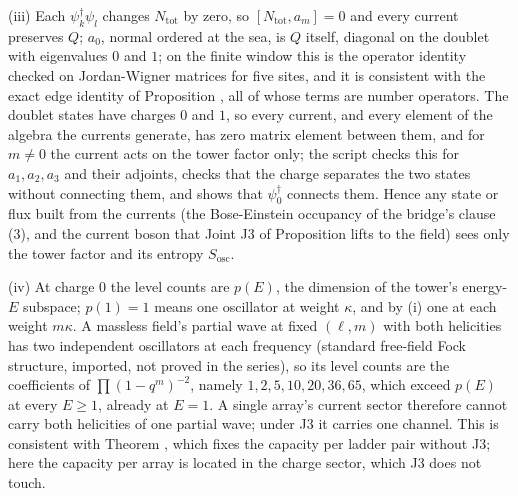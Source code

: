 (iii) Each $\psi_{k}^{\dagger}\psi_{l}$ changes $N_{\mathrm{tot}}$ by zero, so $[N_{\mathrm{tot}}, a_{m}] = 0$ and every current preserves $Q$; $a_{0}$, normal ordered at the sea, is $Q$ itself, diagonal on the doublet with eigenvalues $0$ and $1$; on the finite window this is the operator identity checked on Jordan-Wigner matrices for five sites, and it is consistent with the exact edge identity of Proposition , all of whose terms are number operators. The doublet states have charges $0$ and $1$, so every current, and every element of the algebra the currents generate, has zero matrix element between them, and for $m \neq 0$ the current acts on the tower factor only; the script checks this for $a_{1}, a_{2}, a_{3}$ and their adjoints, checks that the charge separates the two states without connecting them, and shows that $\psi_{0}^{\dagger}$ connects them. Hence any state or flux built from the currents (the Bose-Einstein occupancy of the bridge's clause (3), and the current boson that Joint J3 of Proposition  lifts to the field) sees only the tower factor and its entropy $S_{\mathrm{osc}}$.

(iv) At charge $0$ the level counts are $p(E)$, the dimension of the tower's energy-$E$ subspace; $p(1) = 1$ means one oscillator at weight $\kappa$, and by (i) one at each weight $m\kappa$. A massless field's partial wave at fixed $(\ell, m)$ with both helicities has two independent oscillators at each frequency (standard free-field Fock structure, imported, not proved in the series), so its level counts are the coefficients of $\prod(1 - q^{m})^{-2}$, namely $1, 2, 5, 10, 20, 36, 65$, which exceed $p(E)$ at every $E \ge 1$, already at $E = 1$. A single array's current sector therefore cannot carry both helicities of one partial wave; under J3 it carries one channel. This is consistent with Theorem , which fixes the capacity per ladder pair without J3; here the capacity per array is located in the charge sector, which J3 does not touch.

